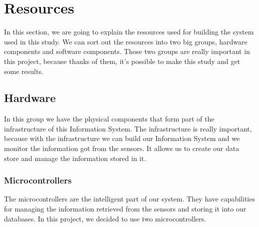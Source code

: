 \section{Resources}

In this section, we are going to explain the resources used for building the system used in this study. We can sort out the resources into two big groups, hardware components and software components. Those two groups are really important in this project, because thanks of them, it's possible to make this study and get some results.

\subsection{Hardware}

In this group we have the physical components that form part of the infrastructure of this Information System. The infrastructure is really important, because with the infrastructure we can build our Information System and we monitor the information got from the sensors. It allows us to create our data store and manage the information stored in it.

\subsubsection{Microcontrollers}

The microcontrollers are the intelligent part of our system. They have capabilities for managing the information retrieved from the sensors and storing it into our databases. In this project, we decided to use two microcontrollers.

